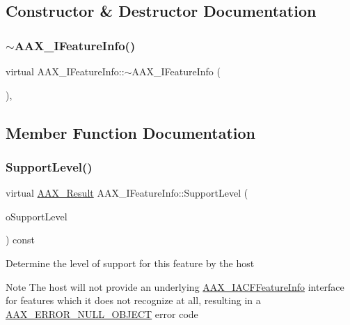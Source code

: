 \subsection{Constructor \& Destructor Documentation}
\mbox{\label{a01829_a41bb5b2ba57b7883c9f96539fcd46fb3}} 
\subsubsection{\texorpdfstring{$\sim$AAX\_IFeatureInfo()}{~AAX\_IFeatureInfo()}}
{\footnotesize\ttfamily virtual A\+A\+X\+\_\+\+I\+Feature\+Info\+::$\sim$\+A\+A\+X\+\_\+\+I\+Feature\+Info (\begin{DoxyParamCaption}{ }\end{DoxyParamCaption})\hspace{0.3cm}{\ttfamily [inline]}, {\ttfamily [virtual]}}



\subsection{Member Function Documentation}
\mbox{\label{a01829_a5f105b85ef855eb8c3da0ff06325b018}} 
\subsubsection{\texorpdfstring{SupportLevel()}{SupportLevel()}}
{\footnotesize\ttfamily virtual \mbox{\hyperlink{a00392_a4d8f69a697df7f70c3a8e9b8ee130d2f}{A\+A\+X\+\_\+\+Result}} A\+A\+X\+\_\+\+I\+Feature\+Info\+::\+Support\+Level (\begin{DoxyParamCaption}\item[{\mbox{\hyperlink{a00491_aca7bf42860665d5da66f4ac342e761b3}{A\+A\+X\+\_\+\+E\+Support\+Level}} \&}]{o\+Support\+Level }\end{DoxyParamCaption}) const\hspace{0.3cm}{\ttfamily [pure virtual]}}

Determine the level of support for this feature by the host

\begin{DoxyNote}{Note}
The host will not provide an underlying \mbox{\hyperlink{a01689}{A\+A\+X\+\_\+\+I\+A\+C\+F\+Feature\+Info}} interface for features which it does not recognize at all, resulting in a \mbox{\hyperlink{a00494_a5f8c7439f3a706c4f8315a9609811937a647cce13fa531e3a46c6eab694048a9c}{A\+A\+X\+\_\+\+E\+R\+R\+O\+R\+\_\+\+N\+U\+L\+L\+\_\+\+O\+B\+J\+E\+CT}} error code 
\end{DoxyNote}


